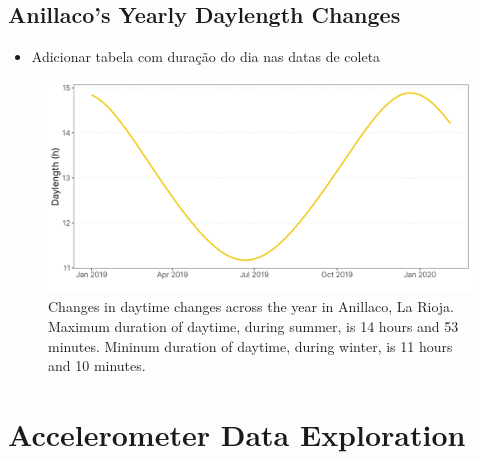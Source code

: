 \documentclass[english,msc,numbers,hidelinks]{coppe}
\providecommand{\tightlist}{%
  \setlength{\itemsep}{0pt}\setlength{\parskip}{0pt}}
\begin{document}
  \hypertarget{anillacos-yearly-daylength-changes}{%
  \section{Anillaco's Yearly Daylength Changes}\label{anillacos-yearly-daylength-changes}}
  \begin{itemize}
  \tightlist
  \item
    Adicionar tabela com duração do dia nas datas de coleta
  \end{itemize}
  \begin{figure}[H]

  {\centering \includegraphics[width=1\linewidth]{../04_figures/appendix/plot_daylength} 

  }

  \caption{Changes in daytime changes across the year in Anillaco, La Rioja. Maximum duration of daytime, during summer, is 14 hours and 53 minutes. Mininum duration of daytime, during winter, is 11 hours and 10 minutes.}\label{fig:appendix-daylength}
  \end{figure}
  \hypertarget{accelerometer-data-exploration}{%
  \chapter{Accelerometer Data Exploration}\label{accelerometer-data-exploration}}
\end{document}
